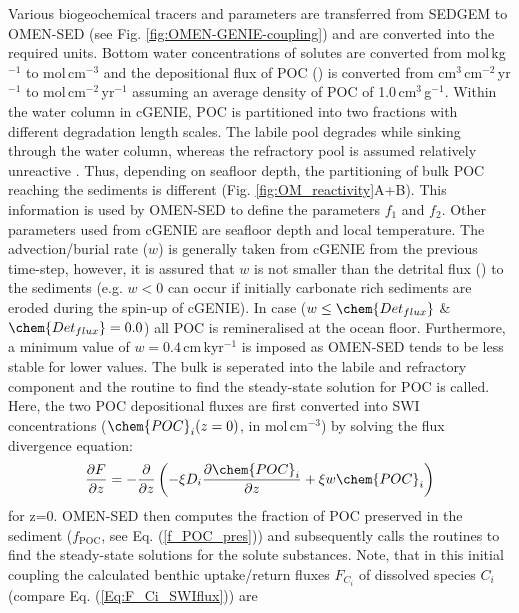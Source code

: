 \documentclass[gmd, manuscript]{copernicus}
\begin{document}
Various biogeochemical tracers and parameters are transferred from SEDGEM to OMEN-SED (see Fig. \ref{fig:OMEN-GENIE-coupling}) and are converted into the required units. 
Bottom water concentrations of solutes are converted from mol\,kg$^{-1}$ to mol\,cm$^{-3}$ and the depositional flux of POC () is converted from cm$^{3}$\,cm$^{-2}$\,yr$^{-1}$ 
to mol\,cm$^{-2}$\,yr$^{-1}$ assuming an average density of POC of 1.0\,cm$^{3}$\,g$^{-1}$. 
Within the water column in cGENIE, POC is partitioned into two fractions with different degradation length scales. The labile pool degrades while sinking through the water column, 
whereas the refractory pool is assumed relatively unreactive \citep{ridgwell_marine_2007}. Thus, depending on seafloor depth, the partitioning of bulk POC reaching the sediments is different 
(Fig. \ref{fig:OM_reactivity}A+B). This information is used by OMEN-SED to define the parameters $f_1$ and $f_2$. 
Other parameters used from cGENIE are seafloor depth and local temperature. 
The advection/burial rate ($w$) is generally taken from cGENIE from the previous time-step, however, it is assured that $w$ is not smaller than the detrital flux ()
to the sediments (e.g. $w<0$ can occur if initially carbonate rich sediments are eroded during the spin-up of cGENIE). In case ($w \leq \chem{Det_{flux}}$ \& $\chem{Det_{flux}} = 0.0$) all POC is remineralised 
at the ocean floor. Furthermore, a minimum value of $w=0.4$\,cm\,kyr$^{-1}$ is imposed as OMEN-SED tends to be less stable for lower values. 
The bulk  is seperated into the labile and refractory component and the routine to find the steady-state solution for POC is called. 
Here, the two POC depositional fluxes are first converted into SWI concentrations ($\chem{POC}_i(z=0)$, in mol\,cm$^{-3}$) by solving the flux divergence equation: 
\begin{equation}
\frac{\partial F}{\partial z}=-\frac{\partial}{\partial z}\left( -\xi D_i \frac{\partial \chem{POC}_i}{\partial z} +\xi w \chem{POC}_i\right) \label{Eq_flux_divergence}
\end{equation}
for z=0. 
OMEN-SED then computes the fraction of POC preserved in the sediment ($f_{\mathrm{POC}}$, see Eq. (\ref{f_POC_pres})) and subsequently calls the routines to find the steady-state 
solutions for the solute substances. Note, that in this initial coupling the calculated benthic uptake/return fluxes $F_{C_i}$ of dissolved species $C_i$ (compare Eq. (\ref{Eq:F_Ci_SWIflux})) are 
\end{document}
